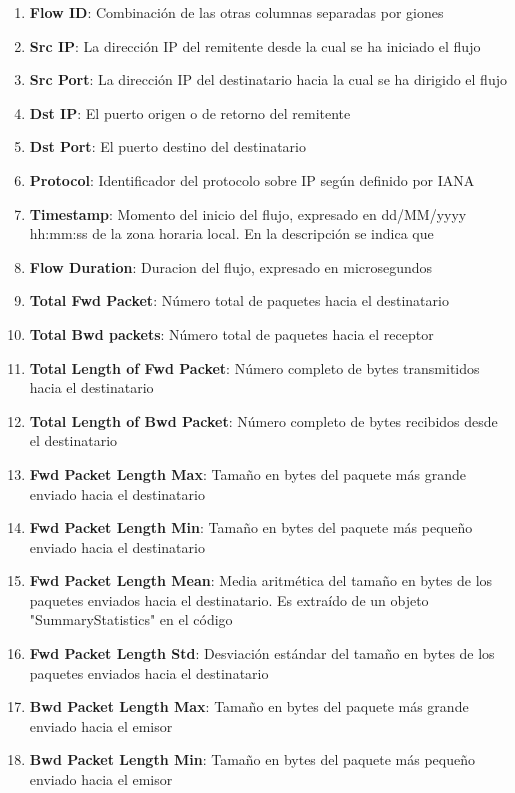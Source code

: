 \begin{enumerate}
    \item \textbf{Flow ID}: Combinación de las otras columnas separadas por giones
    \item \textbf{Src IP}: La dirección IP del remitente desde la cual se ha iniciado el flujo
    \item \textbf{Src Port}: La dirección IP del destinatario hacia la cual se ha dirigido el flujo
    \item \textbf{Dst IP}: El puerto origen o de retorno del remitente
    \item \textbf{Dst Port}: El puerto destino del destinatario
    \item \textbf{Protocol}: Identificador del protocolo sobre IP según definido por IANA \cite{ipprotocolnumbers}
    \item \textbf{Timestamp}: Momento del inicio del flujo, expresado en dd/MM/yyyy hh:mm:ss de la zona horaria local. En la descripción se indica que 
    \item \textbf{Flow Duration}: Duracion del flujo, expresado en microsegundos
    \item \textbf{Total Fwd Packet}: Número total de paquetes hacia el destinatario
    \item \textbf{Total Bwd packets}: Número total de paquetes hacia el receptor
    \item \textbf{Total Length of Fwd Packet}: Número completo de bytes transmitidos hacia el destinatario
    \item \textbf{Total Length of Bwd Packet}: Número completo de bytes recibidos desde el destinatario
    \item \textbf{Fwd Packet Length Max}: Tamaño en bytes del paquete más grande enviado hacia el destinatario
    \item \textbf{Fwd Packet Length Min}: Tamaño en bytes del paquete más pequeño enviado hacia el destinatario
    \item \textbf{Fwd Packet Length Mean}: Media aritmética del tamaño en bytes de los paquetes enviados hacia el destinatario. Es extraído de un objeto "SummaryStatistics" en el código
    \item \textbf{Fwd Packet Length Std}: Desviación estándar del tamaño en bytes de los paquetes enviados hacia el destinatario
    \item \textbf{Bwd Packet Length Max}: Tamaño en bytes del paquete más grande enviado hacia el emisor
    \item \textbf{Bwd Packet Length Min}: Tamaño en bytes del paquete más pequeño enviado hacia el emisor

\end{enumerate}
